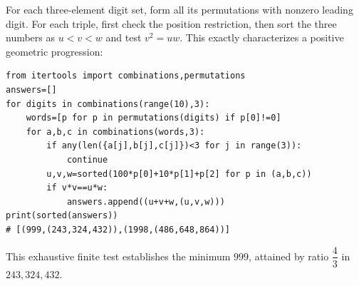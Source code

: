 For each three-element digit set, form all its permutations with nonzero leading digit. For each triple, first check the position restriction, then sort the three numbers as $u<v<w$ and test $v^2=uw$. This exactly characterizes a positive geometric progression:
\begin{verbatim}
from itertools import combinations,permutations
answers=[]
for digits in combinations(range(10),3):
    words=[p for p in permutations(digits) if p[0]!=0]
    for a,b,c in combinations(words,3):
        if any(len({a[j],b[j],c[j]})<3 for j in range(3)):
            continue
        u,v,w=sorted(100*p[0]+10*p[1]+p[2] for p in (a,b,c))
        if v*v==u*w:
            answers.append((u+v+w,(u,v,w)))
print(sorted(answers))
# [(999,(243,324,432)),(1998,(486,648,864))]
\end{verbatim}
This exhaustive finite test establishes the minimum $\boxed{999}$, attained by ratio $\dfrac{4}{3}$ in $243,324,432$.
